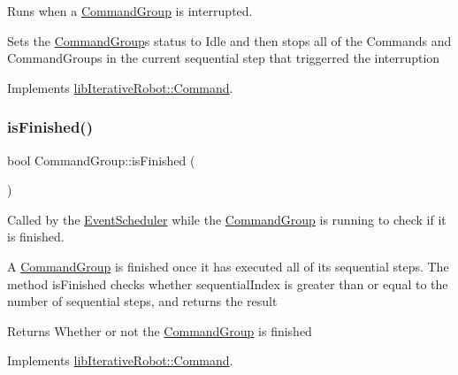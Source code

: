 Runs when a \mbox{\hyperlink{classlib_iterative_robot_1_1_command_group}{Command\+Group}} is interrupted. 

Sets the \mbox{\hyperlink{classlib_iterative_robot_1_1_command_group}{Command\+Group}}\textquotesingle{}s status to Idle and then stops all of the Commands and Command\+Groups in the current sequential step that triggerred the interruption 

Implements \mbox{\hyperlink{classlib_iterative_robot_1_1_command_a1c17b601d1b69822cabadb92069d1747}{lib\+Iterative\+Robot\+::\+Command}}.

\mbox{\label{classlib_iterative_robot_1_1_command_group_a96807a2763adf9e21ebf2cb9e3574e3c}} 
\subsubsection{\texorpdfstring{isFinished()}{isFinished()}}
{\footnotesize\ttfamily bool Command\+Group\+::is\+Finished (\begin{DoxyParamCaption}{ }\end{DoxyParamCaption})\hspace{0.3cm}{\ttfamily [virtual]}}



Called by the \mbox{\hyperlink{classlib_iterative_robot_1_1_event_scheduler}{Event\+Scheduler}} while the \mbox{\hyperlink{classlib_iterative_robot_1_1_command_group}{Command\+Group}} is running to check if it is finished. 

A \mbox{\hyperlink{classlib_iterative_robot_1_1_command_group}{Command\+Group}} is finished once it has executed all of its sequential steps. The method is\+Finished checks whether sequential\+Index is greater than or equal to the number of sequential steps, and returns the result

\begin{DoxyReturn}{Returns}
Whether or not the \mbox{\hyperlink{classlib_iterative_robot_1_1_command_group}{Command\+Group}} is finished 
\end{DoxyReturn}


Implements \mbox{\hyperlink{classlib_iterative_robot_1_1_command_a8e4dccdd88f432a716090f532ba097f7}{lib\+Iterative\+Robot\+::\+Command}}.



